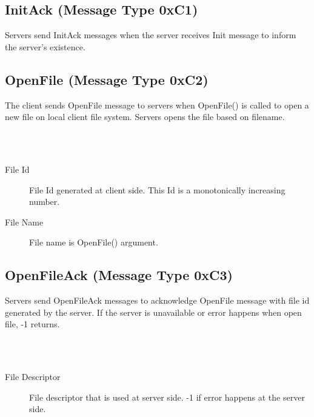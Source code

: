 \documentclass[12pt,fleqn]{article}
\begin{document}
\subsection{InitAck (Message Type 0xC1)}
Servers send InitAck messages when the server receives Init message to inform the server's existence.

\subsection{OpenFile (Message Type 0xC2)}
The client sends OpenFile message to servers when OpenFile() is called to open a new file on local client file system. Servers opens the file based on filename.

\begin{center}
	\begin{bytefield}[bitwidth=1.1em]{16}
		 \\
		 \\
	\end{bytefield}
\end{center}

\begin{description}
	\item[File Id] File Id generated at client side. This Id is a monotonically increasing number.
	\item[File Name] File name is OpenFile() argument. 
\end{description}

\subsection{OpenFileAck (Message Type 0xC3)}
Servers send OpenFileAck messages to acknowledge OpenFile message with file id generated by the server. If the server is unavailable or error happens when open file, -1 returns.

\begin{center}
	\begin{bytefield}[bitwidth=1.1em]{16}
		 \\
		 \\
	\end{bytefield}
\end{center}

\begin{description}
	\item[File Descriptor] File descriptor that is used at server side. -1 if error happens at the server side.
\end{description}
\end{document}
